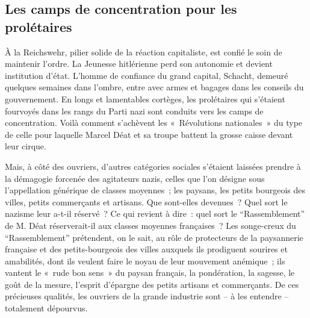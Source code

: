 \documentclass[french,twoside]{book} %
\begin{document}
\subsection[Les camps de concentration pour les prolétaires]{Les camps de concentration pour les prolétaires}
\noindent À la Reichswehr, pilier solide de la réaction capitaliste, est confié le soin de maintenir l’ordre. La Jeunesse hitlérienne perd son autonomie et devient institution d’état. L’homme de confiance du grand capital, Schacht, demeuré quelques semaines dans l’ombre, entre avec armes et bagages dans les conseils du gouvernement. En longs et lamentables cortèges, les prolétaires qui s’étaient fourvoyés dans les rangs du Parti nazi sont conduits vers les camps de concentration. Voilà comment s’achèvent les « Révolutions nationales » du type de celle pour laquelle Marcel Déat et sa troupe battent la grosse caisse devant leur cirque.\par
Mais, à côté des ouvriers, d’autres catégories sociales s’étaient laissées prendre à la démagogie forcenée des agitateurs nazis, celles que l’on désigne sous l’appellation générique de classes moyennes ; les paysans, les petits bourgeois des villes, petits commerçants et artisans. Que sont-elles devenues ? Quel sort le nazisme leur a-t-il réservé ? Ce qui revient à dire : quel sort le “Rassemblement” de M. Déat réserverait-il aux classes moyennes françaises ? Les songe-creux du “Rassemblement” prétendent, on le sait, au rôle de protecteurs de la paysannerie française et des petits-bourgeois des villes auxquels ils prodiguent sourires et amabilités, dont ils veulent faire le noyau de leur mouvement anémique ; ils vantent le « rude bon sens » du paysan français, la pondération, la sagesse, le goût de la mesure, l’esprit d’épargne des petits artisans et commerçants. De ces précieuses qualités, les ouvriers de la grande industrie sont – à les entendre – totalement dépourvus.
\end{document}
